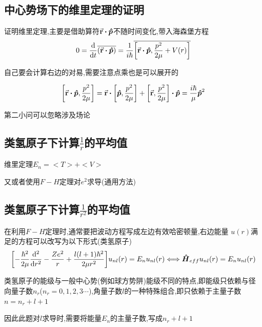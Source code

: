 \documentclass{article}
\begin{document}
        \subsection{中心势场下的维里定理的证明}

            \begin{formal}
                证明维里定理,主要是借助算符$ \va{r} \vdot \vu*{p} $不随时间变化,带入海森堡方程
                $$ 0 = \dv{t} \overline{(\va{r} \vdot \vu*{p})} =  \frac{1}{i\hbar} \overline{\comm{\va{r} \vdot \vu*{p}}{\frac{p^{2}}{2\mu}+V(r)}} $$
            \end{formal}

            自己要会计算右边的对易,需要注意点乘也是可以展开的

            $$ 
            \comm{\va{r} \vdot \vu*{p} }{\frac{p^{2}}{2\mu}} = \va{r} \vdot \comm{\vu*{p}}{\frac{p^{2}}{2\mu}} + 
            \comm{\va{r}}{\frac{p^{2}}{2\mu}} \vdot \vu*{p} = \frac{i\hbar}{\mu}\vu*{p}^{2} 
            $$

            第二小问可以忽略涉及场论

        \subsection{类氢原子下计算\texorpdfstring{$\frac{1}{r}$}{}的平均值}
            维里定理$ E_{n} = <T> +  <V>  $

            又或者使用$F-H$定理对$e^{2}$求导(通用方法)

        \subsection{类氢原子下计算\texorpdfstring{$\frac{1}{r^{2}}$}{}的平均值}
            在利用$F-H$定理时,通常要把波动方程写成左边有效哈密顿量,右边能量
            $u(r)$满足的方程可以改写为以下形式(类氢原子)
            $$ 
            \qty[ -\frac{\hbar^{2}}{2\mu} \dv[2]{r} - \frac{Ze^{2}}{r} + 
            \frac{l(l+1)\hbar^{2}}{2\mu r^{2}} ] u_{nl}(r) = E_{n} u_{nl}(r)  \Longleftrightarrow  \vu*{H}_{eff} u_{nl}(r) = E_{n} u_{nl}(r)
            $$

            \begin{formal}
                类氢原子的能级与一般中心势(例如球方势阱)能级不同的特点,即能级只依赖与径向量子数$n_{r}$($n_{r} = 0,1,2,3\cdots$),角量子数$l$的一种特殊组合,即只依赖于主量子数$n = n_{r} + l + 1$
            \end{formal}

            因此此题对$l$求导时,需要将能量$E_{n}$的主量子数,写成$n_{r}+l+1$
\end{document}
